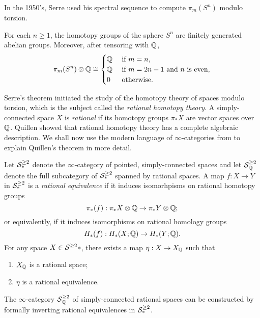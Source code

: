 In the 1950's, Serre used his spectral sequence to compute $\pi_m(S^n)$ modulo torsion.
\begin{theorem}
[Serre]
    For each $n\geq 1$, the homotopy groups of the sphere $S^n$ are finitely generated abelian groups.
    Moreover, after tensoring with ${\mathbb{Q}}$, 
    \[
    \pi_m (S^n)\otimes {\mathbb{Q}} \cong
    \begin{cases}
    {\mathbb{Q}} & \text{ if $m=n$,}\\
    {\mathbb{Q}} & \text{ if $m=2n-1$ and $n$ is even,}\\
    0   & \text{ otherwise.}
    \end{cases}
    \]
\end{theorem}

Serre's theorem initiated the study of the homotopy theory of spaces modulo torsion, which is the subject called the \emph{rational homotopy theory}. A simply-connected space $X$ is \emph{rational} if its homotopy groups $\pi_* X$ are vector spaces over ${\mathbb{Q}}$.
Quillen \cite{Quillen_RHT} showed that rational homotopy theory has a complete algebraic description. 
We shall now use the modern language of $\infty$-categories from \cite{HTT} to explain Quillen's theorem in more detail.

Let ${\mathcal{S}}^{\geq 2}_*$ denote the $\infty$-category of pointed, simply-connected spaces and let $\operatorname{\mathcal{S}}^{\geq 2}_{{\mathbb{Q}}}$ denote the full subcategory of ${\mathcal{S}}^{\geq 2}_*$ spanned by rational spaces.
A map $f:X\to Y$ in ${\mathcal{S}}^{\geq 2}_*$ is a \emph{rational equivalence} if it induces isomorhpisms on rational homotopy groups
\[
\pi_*(f): \pi_*X \otimes {\mathbb{Q}} \to \pi_*Y \otimes {\mathbb{Q}};
\]
or equivalently, if it induces isomorphisms on rational homology groups
\[
H_*(f): H_*(X;{\mathbb{Q}})  \to H_*(Y;{\mathbb{Q}}).
\]
For any space $X\in {\mathcal{S}}^{\geq 2}*$, there exists a map $\eta:X\to X_{{\mathbb{Q}}}$ such that
\begin{enumerate}
    \item $X_{{\mathbb{Q}}}$ is a rational space;
    \item $\eta$ is a rational equivalence.
\end{enumerate}
The $\infty$-category $\operatorname{\mathcal{S}}^{\geq 2}_{{\mathbb{Q}}}$ of simply-connected rational spaces can be constructed by formally inverting rational equivalences in ${\mathcal{S}}^{\geq 2}_*$.

